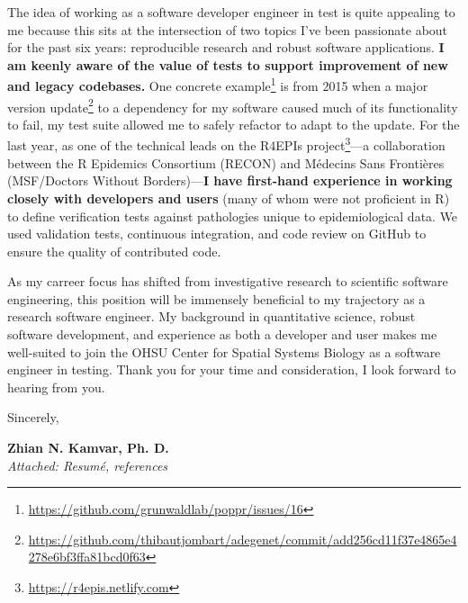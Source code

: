 \vspace{1ex}

The idea of working as a software developer engineer in test is quite appealing to me
because this sits at the intersection of two topics I've been passionate about
for the past six years: reproducible research and robust software applications.
\textbf{I am keenly aware of the value of tests to support improvement of new and
legacy codebases.} One
concrete example\footnote{\url{https://github.com/grunwaldlab/poppr/issues/16}} is
from 2015 when a major version
update\footnote{\url{https://github.com/thibautjombart/adegenet/commit/add256cd11f37e4865e4278e6bf3ffa81bcd0f63}}
to a dependency for my software caused much of its functionality to fail, my
test suite allowed me to safely refactor to adapt to the update. For the last
year, as one of the technical leads on the R4EPIs
project\footnote{\url{https://r4epis.netlify.com}}---a collaboration between
the R Epidemics Consortium (RECON) and M\'{e}decins Sans Fronti\`{e}res
(MSF/Doctors Without Borders)---\textbf{I have first-hand experience in working closely with developers
and users} (many of whom were not proficient in R) to define verification tests
against pathologies unique to epidemiological data. We used validation tests,
continuous integration, and code review on GitHub to ensure the quality of
contributed code.

\vspace{1ex}

As my carreer focus has shifted from investigative research to scientific
software engineering, this position will be immensely beneficial to my
trajectory as a research software engineer. My background in quantitative
science, robust software development, and experience as both a developer and 
user makes me well-suited to join the OHSU Center for Spatial Systems Biology
as a software engineer in testing. Thank you for your time and consideration, I
look forward to hearing from you. 

\vspace{2ex}

Sincerely,

\vspace{5ex}

\textbf{Zhian N. Kamvar, Ph. D.}\\
\textit{Attached: Resum\'{e}, references}







